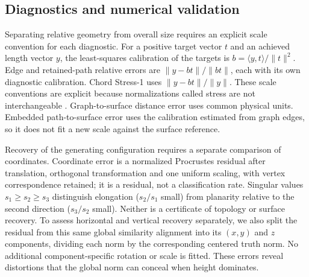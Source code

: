 \documentclass[11pt]{article}
\newcommand{\norm}[1]{\lVert#1\rVert}
\begin{document}
\subsection{Diagnostics and numerical validation}
Separating relative geometry from overall size requires an explicit scale
convention for each diagnostic. For a positive target vector $t$ and an
achieved length vector $y$, the least-squares calibration of the targets is
$b=\langle y,t\rangle/\norm{t}^2$. Edge and retained-path relative errors are
$\norm{y-bt}/\norm{bt}$, each with its own diagnostic calibration. Chord
Stress-1 uses $\norm{y-bt}/\norm{y}$. These scale conventions are explicit
because normalizations called stress are not interchangeable \citep{mair2022}.
Graph-to-surface distance error uses common physical units. Embedded
path-to-surface error uses the calibration estimated from graph edges, so it
does not fit a new scale against the surface reference.

Recovery of the generating configuration requires a separate comparison of
coordinates. Coordinate error is a normalized Procrustes residual after translation,
orthogonal transformation and one uniform scaling, with vertex correspondence
retained; it is a residual, not a classification rate. Singular
values $s_1\ge s_2\ge s_3$ distinguish elongation ($s_2/s_1$ small) from
planarity relative to the second direction ($s_3/s_2$ small). Neither is a
certificate of topology or surface recovery.
To assess horizontal and vertical recovery separately, we also split the
residual from this same global similarity alignment into its $(x,y)$ and $z$
components, dividing each norm by the corresponding centered truth norm.
No additional component-specific rotation or scale is fitted. These
errors reveal distortions that the global norm can conceal when height dominates.
\end{document}
